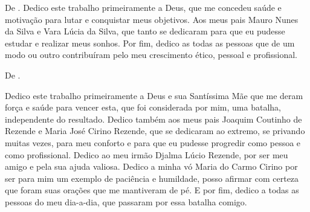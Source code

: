 \begin{dedicatoria}
	\vspace*{\fill}
	
	De \imprimirAutorUm.
	\newline
	Dedico este trabalho primeiramente a Deus, que me concedeu saúde e motivação
	para lutar e conquistar meus objetivos. Aos meus pais Mauro Nunes da Silva e
	Vara Lúcia da Silva, que tanto se dedicaram para que eu pudesse estudar e
	realizar meus sonhos. Por fim, dedico as todas as pessoas que de um modo ou
	outro contribuíram pelo meu crescimento ético, pessoal e profissional.
	
	\vspace*{\fill}
	De \imprimirAutorDois.
	\newline
	\par Dedico este trabalho primeiramente a Deus e sua Santíssima Mãe que me
	deram força e saúde para vencer esta, que foi considerada por mim, uma
	batalha, independente do resultado. Dedico também aos meus pais Joaquim
	Coutinho de Rezende e Maria José Cirino Rezende, que se dedicaram ao extremo,
	se privando muitas vezes, para meu conforto e para que eu pudesse progredir
	como pessoa e como profissional. Dedico ao meu irmão Djalma Lúcio Rezende, por
	ser meu amigo e pela sua ajuda valiosa. Dedico a minha vó Maria do Carmo
	Cirino por ser para mim um exemplo de paciência e humildade, posso afirmar com
	certeza que foram suas orações que me mantiveram de pé. E por fim, dedico a
	todas as pessoas do meu dia-a-dia, que passaram por essa batalha comigo.

\end{dedicatoria}

